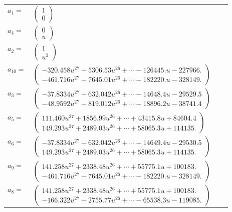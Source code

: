 \documentclass[1p]{elsarticle_modified}
\theoremstyle{definition}
\begin{document}
\begin{tabular}{m{7pt} m{180pt} m{7pt} m{180pt} }
\flushright $a_{1}=$&$\begin{pmatrix}1\\0\end{pmatrix}$ \\
\flushright $a_{4}=$&$\begin{pmatrix}0\\u\end{pmatrix}$ \\
\flushright $a_{2}=$&$\begin{pmatrix}1\\u^2\end{pmatrix}$ \\
\flushright $a_{10}=$&$\begin{pmatrix}-320.458 u^{27}-5306.53 u^{26}+\cdots-126445. u-227966.\\-461.716 u^{27}-7645.01 u^{26}+\cdots-182220. u-328149.\end{pmatrix}$ \\
\flushright $a_{3}=$&$\begin{pmatrix}-37.8334 u^{27}-632.042 u^{26}+\cdots-14648.4 u-29529.5\\-48.9592 u^{27}-819.012 u^{26}+\cdots-18896.2 u-38741.4\end{pmatrix}$ \\
\flushright $a_{5}=$&$\begin{pmatrix}111.460 u^{27}+1856.99 u^{26}+\cdots+43415.8 u+84604.4\\149.293 u^{27}+2489.03 u^{26}+\cdots+58065.3 u+114135.\end{pmatrix}$ \\
\flushright $a_{6}=$&$\begin{pmatrix}-37.8334 u^{27}-632.042 u^{26}+\cdots-14649.4 u-29530.5\\149.293 u^{27}+2489.03 u^{26}+\cdots+58065.3 u+114135.\end{pmatrix}$ \\
\flushright $a_{9}=$&$\begin{pmatrix}141.258 u^{27}+2338.48 u^{26}+\cdots+55775.1 u+100183.\\-461.716 u^{27}-7645.01 u^{26}+\cdots-182220. u-328149.\end{pmatrix}$ \\
\flushright $a_{8}=$&$\begin{pmatrix}141.258 u^{27}+2338.48 u^{26}+\cdots+55775.1 u+100183.\\-166.322 u^{27}-2755.77 u^{26}+\cdots-65538.3 u-119085.\end{pmatrix}$ \\

\end{tabular}
\end{document}
